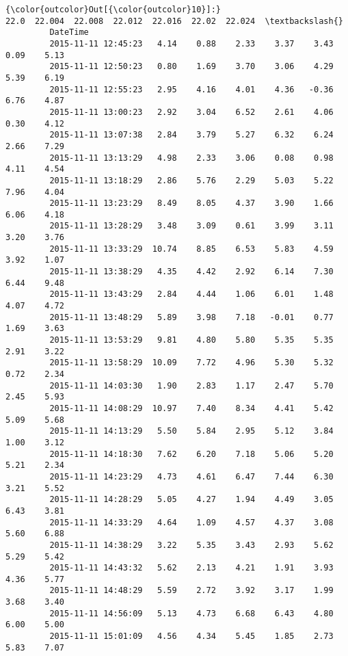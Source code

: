 \documentclass[a4paper,dvipdfmx]{jsarticle}
\begin{document}
            \begin{Verbatim}[commandchars=\\\{\}]
{\color{outcolor}Out[{\color{outcolor}10}]:}                       22.0  22.004  22.008  22.012  22.016  22.02  22.024  \textbackslash{}
         DateTime                                                                    
         2015-11-11 12:45:23   4.14    0.88    2.33    3.37    3.43   0.09    5.13   
         2015-11-11 12:50:23   0.80    1.69    3.70    3.06    4.29   5.39    6.19   
         2015-11-11 12:55:23   2.95    4.16    4.01    4.36   -0.36   6.76    4.87   
         2015-11-11 13:00:23   2.92    3.04    6.52    2.61    4.06   0.30    4.12   
         2015-11-11 13:07:38   2.84    3.79    5.27    6.32    6.24   2.66    7.29   
         2015-11-11 13:13:29   4.98    2.33    3.06    0.08    0.98   4.11    4.54   
         2015-11-11 13:18:29   2.86    5.76    2.29    5.03    5.22   7.96    4.04   
         2015-11-11 13:23:29   8.49    8.05    4.37    3.90    1.66   6.06    4.18   
         2015-11-11 13:28:29   3.48    3.09    0.61    3.99    3.11   3.20    3.76   
         2015-11-11 13:33:29  10.74    8.85    6.53    5.83    4.59   3.92    1.07   
         2015-11-11 13:38:29   4.35    4.42    2.92    6.14    7.30   6.44    9.48   
         2015-11-11 13:43:29   2.84    4.44    1.06    6.01    1.48   4.07    4.72   
         2015-11-11 13:48:29   5.89    3.98    7.18   -0.01    0.77   1.69    3.63   
         2015-11-11 13:53:29   9.81    4.80    5.80    5.35    5.35   2.91    3.22   
         2015-11-11 13:58:29  10.09    7.72    4.96    5.30    5.32   0.72    2.34   
         2015-11-11 14:03:30   1.90    2.83    1.17    2.47    5.70   2.45    5.93   
         2015-11-11 14:08:29  10.97    7.40    8.34    4.41    5.42   5.09    5.68   
         2015-11-11 14:13:29   5.50    5.84    2.95    5.12    3.84   1.00    3.12   
         2015-11-11 14:18:30   7.62    6.20    7.18    5.06    5.20   5.21    2.34   
         2015-11-11 14:23:29   4.73    4.61    6.47    7.44    6.30   3.21    5.52   
         2015-11-11 14:28:29   5.05    4.27    1.94    4.49    3.05   6.43    3.81   
         2015-11-11 14:33:29   4.64    1.09    4.57    4.37    3.08   5.60    6.88   
         2015-11-11 14:38:29   3.22    5.35    3.43    2.93    5.62   5.29    5.42   
         2015-11-11 14:43:32   5.62    2.13    4.21    1.91    3.93   4.36    5.77   
         2015-11-11 14:48:29   5.59    2.72    3.92    3.17    1.99   3.68    3.40   
         2015-11-11 14:56:09   5.13    4.73    6.68    6.43    4.80   6.00    5.00   
         2015-11-11 15:01:09   4.56    4.34    5.45    1.85    2.73   5.83    7.07   

\end{Verbatim}
\end{document}
